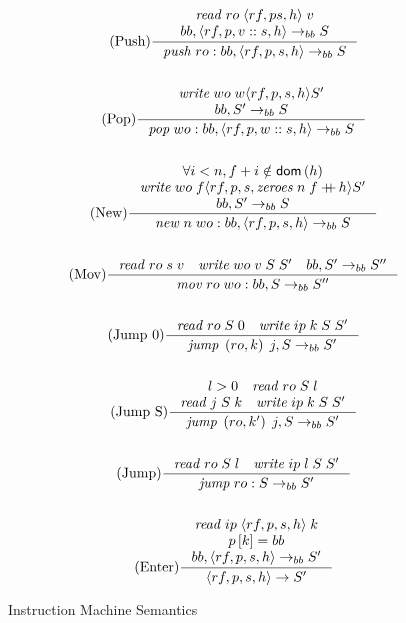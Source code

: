 \begin{figure}
\begin{gather*}
\tag{Push}
\inference{
\mathit{read} \; ro \; \langle rf, p s, h \rangle \; v \\
bb, \langle rf, p, v::s, h \rangle \rightarrow_{bb} S 
}{\mathit{push} \; ro : bb, \langle rf, p, s, h \rangle \rightarrow_{bb} S} \\ \\
\tag{Pop}
\inference{
\mathit{write} \; wo \; w \langle rf, p, s, h \rangle S' \\
bb, S' \rightarrow_{bb} S \\
}{\mathit{pop} \; wo:bb, \langle rf, p, w::s, h \rangle \rightarrow_{bb} S}  \\ \\
\tag{New} \inference{
\forall i < n, f+i \notin \textsf{dom}\left(h\right) \\
\mathit{write} \; wo \; f \langle rf, p, s, \mathit{zeroes} \; n \; f \concat h \rangle S' \\
bb, S' \rightarrow_{bb} S
}{\mathit{new} \; n \; wo:bb, \langle rf, p, s, h \rangle \rightarrow_{bb} S} \\ \\
\tag{Mov} \inference{
\mathit{read} \; ro \; s \; v \quad
\mathit{write} \; wo \; v \; S \; S' \quad
bb, S' \rightarrow_{bb} S''
}{\mathit{mov} \; ro \; wo:bb, S \rightarrow_{bb} S''} \\ \\
\tag{Jump 0} \inference{
\mathit{read} \; ro \; S \; 0 \quad
\mathit{write} \; ip \; k \; S \; S'
}{\mathit{jump} \; \left(ro, k\right) \; j, S \rightarrow_{bb} S'} \\ \\
\tag{Jump S} \inference{
l > 0 \quad 
\mathit{read} \; ro \; S \; l \\
\mathit{read} \; j \; S \; k \quad
\mathit{write} \; ip \; k \; S \; S'
}{\mathit{jump} \; \left(ro, k'\right) \; j, S \rightarrow_{bb} S'} \\ \\
\tag{Jump} \inference{
\mathit{read} \; ro \; S \; l \quad
\mathit{write} \; ip \; l \; S \; S'
}{\mathit{jump} \; ro:S \rightarrow_{bb} S'} \\ \\
\tag{Enter} \inference{
\mathit{read} \; ip \; \langle rf, p, s, h \rangle \; k \\
p\left[k\right] = bb \\
bb, \langle rf, p, s, h \rangle \rightarrow_{bb} S' 
}{\langle rf, p, s, h \rangle \rightarrow S'}
\end{gather*}
\caption{Instruction Machine Semantics}
\label{fig:im_semantics}
\end{figure}

